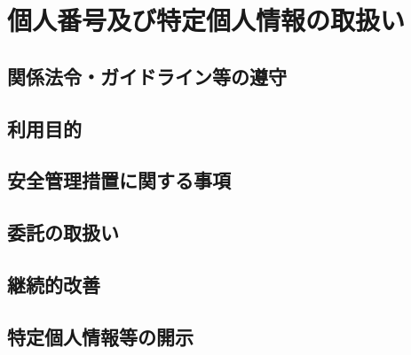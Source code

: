 \chapter{個人番号及び特定個人情報の取扱い}
\section{関係法令・ガイドライン等の遵守}
\section{利用目的}
\section{安全管理措置に関する事項}
\section{委託の取扱い}
\section{継続的改善}
\section{特定個人情報等の開示}